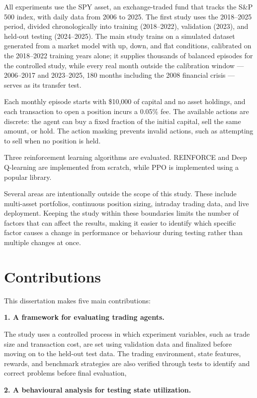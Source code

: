 All experiments use the SPY asset, an exchange-traded fund that tracks
the S\&P 500 index, with daily data from 2006 to 2025. The first study
uses the 2018--2025 period, divided chronologically into training
(2018--2022), validation (2023), and held-out testing (2024--2025). The
main study trains on a simulated dataset generated from a market model
with up, down, and flat conditions, calibrated on the 2018--2022
training years alone; it supplies thousands of balanced episodes for the controlled
study, while every real month outside the calibration window ---
2006--2017 and 2023--2025, 180 months including the 2008 financial
crisis --- serves as its transfer test.

Each monthly episode starts with \$10,000 of capital and no asset
holdings, and each transaction to open a position incurs a 0.05\% fee.
The available actions are discrete: the agent can buy a fixed fraction
of the initial capital, sell the same amount, or hold. The action
masking prevents invalid actions, such as attempting to sell when no
position is held.

Three reinforcement learning algorithms are evaluated. REINFORCE and
Deep Q-learning are implemented from scratch, while PPO is implemented
using a popular library.

Several areas are intentionally outside the scope of this study. These
include multi-asset portfolios, continuous position sizing, intraday
trading data, and live deployment. Keeping the study within these
boundaries limits the number of factors that can affect the results,
making it easier to identify which specific factor causes a change in
performance or behaviour during testing rather than multiple changes at
once.

\section{Contributions}

This dissertation makes five main contributions:

\textbf{1. A framework for evaluating trading agents.}

The study uses a controlled process in which experiment variables, such
as trade size and transaction cost, are set using validation data and
finalized before moving on to the held-out test data. The trading
environment, state features, rewards, and benchmark strategies are also
verified through tests to identify and correct problems before final
evaluation,

\textbf{2. A behavioural analysis for testing state utilization.}

